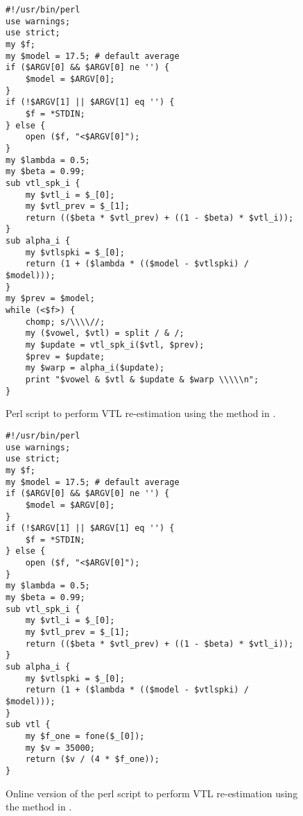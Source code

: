 \documentclass[11pt]{article}
\begin{document}
\begin{figure*}
\caption{Perl script to perform VTL re-estimation using the method in \citet{rodriguez2010line}.}
\label{app:rodriguez}
\begin{small}
\begin{verbatim}
#!/usr/bin/perl
use warnings;
use strict;
my $f;
my $model = 17.5; # default average
if ($ARGV[0] && $ARGV[0] ne '') {
    $model = $ARGV[0];
}
if (!$ARGV[1] || $ARGV[1] eq '') {
    $f = *STDIN;
} else {
    open ($f, "<$ARGV[0]");
}
my $lambda = 0.5;
my $beta = 0.99;
sub vtl_spk_i {
    my $vtl_i = $_[0];
    my $vtl_prev = $_[1];
    return (($beta * $vtl_prev) + ((1 - $beta) * $vtl_i));
}
sub alpha_i {
    my $vtlspki = $_[0];
    return (1 + ($lambda * (($model - $vtlspki) / $model)));
}
my $prev = $model;
while (<$f>) {
    chomp; s/\\\\//;
    my ($vowel, $vtl) = split / & /;
    my $update = vtl_spk_i($vtl, $prev);
    $prev = $update;
    my $warp = alpha_i($update);
    print "$vowel & $vtl & $update & $warp \\\\\n";
}
\end{verbatim}
\end{small}
\end{figure*}

\begin{figure*}
\caption{Online version of the perl script to perform VTL re-estimation using the method in \citet{rodriguez2010line}.}
\label{app:rodriguezonline}
\begin{small}
\begin{verbatim}
#!/usr/bin/perl
use warnings;
use strict;
my $f;
my $model = 17.5; # default average
if ($ARGV[0] && $ARGV[0] ne '') {
    $model = $ARGV[0];
}
if (!$ARGV[1] || $ARGV[1] eq '') {
    $f = *STDIN;
} else {
    open ($f, "<$ARGV[0]");
}
my $lambda = 0.5;
my $beta = 0.99;
sub vtl_spk_i {
    my $vtl_i = $_[0];
    my $vtl_prev = $_[1];
    return (($beta * $vtl_prev) + ((1 - $beta) * $vtl_i));
}
sub alpha_i {
    my $vtlspki = $_[0];
    return (1 + ($lambda * (($model - $vtlspki) / $model)));
}
sub vtl {
    my $f_one = fone($_[0]);
    my $v = 35000;
    return ($v / (4 * $f_one));
}
\end{verbatim}
\end{small}
\end{figure*}
\end{document}
